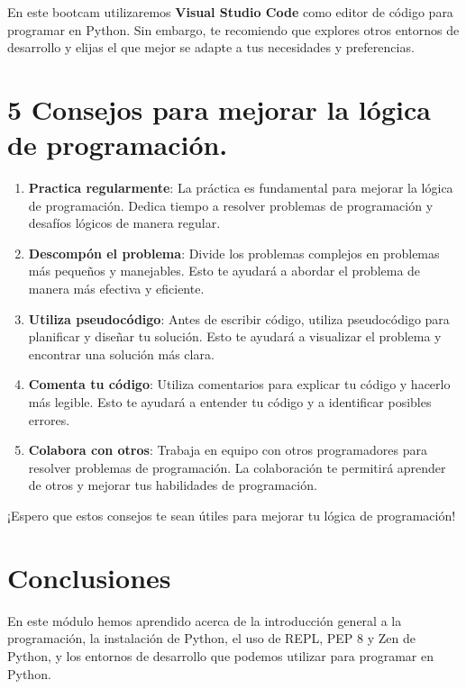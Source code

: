 \documentclass[
  a4paper,
  DIV=11,
  numbers=noendperiod,
  onepage,
  openany]{scrreprt}
\begin{document}
En este bootcam utilizaremos \textbf{Visual Studio Code} como editor de
código para programar en Python. Sin embargo, te recomiendo que explores
otros entornos de desarrollo y elijas el que mejor se adapte a tus
necesidades y preferencias.

\section{5 Consejos para mejorar la lógica de
programación.}\label{consejos-para-mejorar-la-luxf3gica-de-programaciuxf3n.}

\begin{enumerate}
\def\labelenumi{\arabic{enumi}.}
\item
  \textbf{Practica regularmente}: La práctica es fundamental para
  mejorar la lógica de programación. Dedica tiempo a resolver problemas
  de programación y desafíos lógicos de manera regular.
\item
  \textbf{Descompón el problema}: Divide los problemas complejos en
  problemas más pequeños y manejables. Esto te ayudará a abordar el
  problema de manera más efectiva y eficiente.
\item
  \textbf{Utiliza pseudocódigo}: Antes de escribir código, utiliza
  pseudocódigo para planificar y diseñar tu solución. Esto te ayudará a
  visualizar el problema y encontrar una solución más clara.
\item
  \textbf{Comenta tu código}: Utiliza comentarios para explicar tu
  código y hacerlo más legible. Esto te ayudará a entender tu código y a
  identificar posibles errores.
\item
  \textbf{Colabora con otros}: Trabaja en equipo con otros programadores
  para resolver problemas de programación. La colaboración te permitirá
  aprender de otros y mejorar tus habilidades de programación.
\end{enumerate}

¡Espero que estos consejos te sean útiles para mejorar tu lógica de
programación!

\section{Conclusiones}\label{conclusiones}

En este módulo hemos aprendido acerca de la introducción general a la
programación, la instalación de Python, el uso de REPL, PEP 8 y Zen de
Python, y los entornos de desarrollo que podemos utilizar para programar
en Python.
\end{document}
